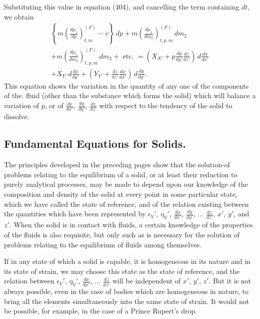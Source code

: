 \documentclass[12pt]{article}
\begin{document}
{Substituting this value in equation (404), and cancelling the term containing $dt$, we obtain
\begin{multline}
\left\{m\left( \frac{d \mu_1}{dp}\right)_{t,m}^{(F)} -v \right\}\, dp + m \left( \frac{d \mu_1}{dm_2}\right)_{t,p,m}^{(F)} \, dm_2 \\
+ m \left( \frac{d \mu_1}{dm_3}\right)_{t,p,m}^{(F)} \, dm_3
+ \text{ etc. } = \left(X_{X'} +p \frac{dy}{dy'}\frac{dz}{dz'}\right)\,d\frac{dx}{dx'} \\
+ X_{Y'}\, d \frac{dx}{dy'} +\left(Y_{Y'} +\frac{dz}{dz'}\frac{dx}{dx'}\right)\, d \frac{dy}{dy'}. \label{411} \end{multline}
This equation shows the variation in the quantity of any one of the components of the. fluid (other than the substance which forms the
solid) which will balance a variation of $p$, or of $\frac{dx}{dx'}$, $\frac{dy}{dy'}$, $\frac{dz}{dz'}$ with respect to the tendency of the solid to dissolve.

\subsection{Fundamental Equations for Solids.}
The principles developed in the preceding pages show that the solution-of problems relating to the equilibrium of a solid, or at least their reduction to purely analytical processes, may be made to depend upon our knowledge of the composition and density of the solid at every point in some particular state, which we have called the state of reference, and of the relation existing between the quantities which have been represented by $\epsilon_V'$, $\eta_V'$, $\frac{dx}{dx'}$, $\frac{dy}{dy'}$, ...  $\frac{dz}{dz'}$, $x'$, $y'$, and $z'$. When the solid is in contact with fluids, a certain knowledge of the properties of the fluids is also requisite, but only such as is necessary for the solution of problems relating to the equilibrium of fluids among themselves.


If in any state of which a solid is capable, it is homogeneous in its nature and in its state of strain, we may choose this state as the state
of reference, and the relation between $\epsilon_V'$, $\eta_V'$, $\frac{dx}{dx'}$, ...  $\frac{dz}{dz'}$ will be
independent of $x'$, $y'$, $z'$. But it is not always possible, even in the case of bodies which are homogeneous in nature, to bring all the elements simultaneously into the same state of strain. It would not be possible, for example, in the case of a Prince Rupert's drop.


}
\end{document}
